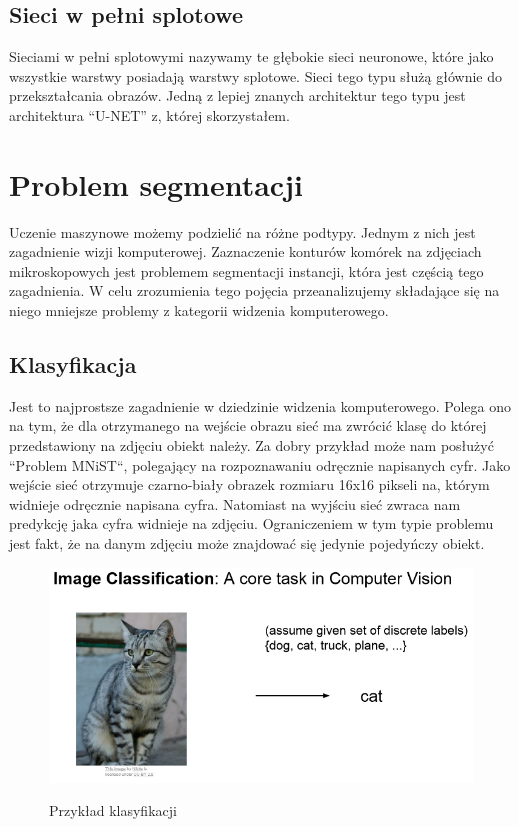\documentclass{article}
\begin{document}
\subsection{Sieci w pełni splotowe}
Sieciami w pełni splotowymi nazywamy te głębokie sieci neuronowe, które jako wszystkie warstwy posiadają warstwy splotowe.
Sieci tego typu służą głównie do przekształcania obrazów.
Jedną z lepiej znanych architektur tego typu jest architektura ``U-NET'' z, której skorzystałem.
\newpage
\section{Problem segmentacji}
Uczenie maszynowe możemy podzielić na różne podtypy.
Jednym z nich jest zagadnienie wizji komputerowej.
Zaznaczenie konturów komórek na zdjęciach mikroskopowych jest problemem segmentacji instancji, która jest częścią tego zagadnienia.
W celu zrozumienia tego pojęcia przeanalizujemy składające się na niego mniejsze problemy z kategorii widzenia komputerowego.
\subsection{Klasyfikacja}
Jest to najprostsze zagadnienie w dziedzinie widzenia komputerowego.
Polega ono na tym, że dla otrzymanego na wejście obrazu sieć ma zwrócić klasę do której przedstawiony na zdjęciu obiekt należy.
Za dobry przykład może nam posłużyć ``Problem MNiST``, polegający na rozpoznawaniu odręcznie napisanych cyfr.
Jako wejście sieć otrzymuje czarno-biały obrazek rozmiaru 16x16 pikseli na, którym widnieje odręcznie napisana cyfra.
Natomiast na wyjściu sieć zwraca nam predykcję jaka cyfra widnieje na zdjęciu.
Ograniczeniem w tym typie problemu jest fakt, że na danym zdjęciu może znajdować się jedynie pojedyńczy obiekt.
\begin{figure}[H]
    \centering
    \includegraphics[width=\linewidth]{images/klasyfikacja.png}
    \caption{Przykład klasyfikacji}
    \cite{unet}
    \label{fig:klasyfikacja}
\end{figure}
\end{document}
